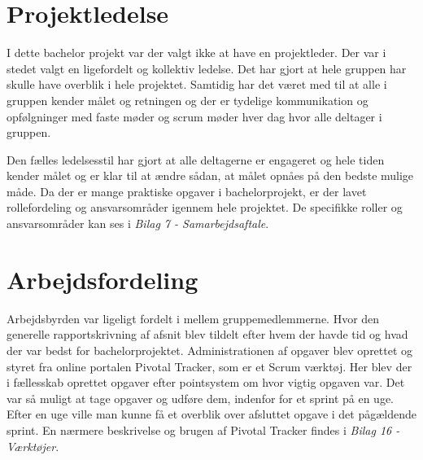 %
% 



 


\chapter{Projektledelse}
I dette bachelor projekt var der valgt ikke at have en projektleder. Der var i stedet valgt en
ligefordelt og kollektiv ledelse. Det har gjort at hele gruppen har skulle have overblik i hele
projektet. Samtidig har det været med til at alle i gruppen kender målet og retningen og der
er tydelige kommunikation og opfølgninger med faste møder og scrum møder hver dag hvor
alle deltager i gruppen. 

Den fælles ledelsesstil har gjort at alle deltagerne er engageret og
hele tiden kender målet og er klar til at ændre sådan, at målet opnåes på den bedste mulige
måde. Da der er mange praktiske opgaver i bachelorprojekt, er der lavet rollefordeling og
ansvarsområder igennem hele projektet. De specifikke roller og ansvarsområder kan ses i
\textit{Bilag 7 - Samarbejdsaftale}.



\chapter{Arbejdsfordeling}
Arbejdsbyrden var ligeligt fordelt i mellem gruppemedlemmerne. Hvor den generelle
rapportskrivning af afsnit blev tildelt efter hvem der havde tid og hvad der var bedst for
bachelorprojektet. Administrationen af opgaver blev oprettet og styret fra online portalen
Pivotal Tracker, som er et Scrum værktøj. Her blev der i fællesskab oprettet opgaver efter
pointsystem om hvor vigtig opgaven var. Det var så muligt at tage opgaver og udføre dem,
indenfor for et sprint på en uge. Efter en uge ville man kunne få et overblik over afsluttet
opgave i det pågældende sprint. En nærmere beskrivelse og brugen af Pivotal Tracker findes
i \textit{Bilag 16 - Værktøjer}.





